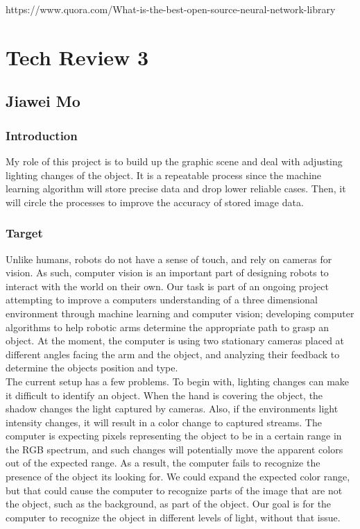 \documentclass[10pt,journal,compsoc, draftclsnofoot,onecolumn]{IEEEtran}
\begin{document}
\noindent
[5]	https://www.quora.com/What-is-the-best-open-source-neural-network-library

\newpage
\section{Tech Review 3}
\subsection{Jiawei Mo}
\subsubsection{Introduction}
My role of this project is to build up the graphic scene and deal with adjusting lighting changes of the object. It is a repeatable process since the machine learning algorithm will store precise data and drop lower reliable cases. Then, it will circle the processes to improve the accuracy of stored image data. 

\subsubsection{Target}
Unlike humans, robots do not have a sense of touch, and rely on cameras for vision. As such, computer vision is an important part of designing robots to interact with the world on their own. Our task is part of an ongoing project attempting to improve a computers understanding of a three dimensional environment through machine learning and computer vision; developing computer algorithms to help robotic arms determine the appropriate path to grasp an object. At the moment, the computer is using two stationary cameras placed at different angles facing the arm and the object, and analyzing their feedback to determine the objects position and type. \\

\noindent
The current setup has a few problems. To begin with, lighting changes can make it difficult to identify an object. When the hand is covering the object, the shadow changes the light captured by cameras. Also, if the environments light intensity changes, it will result in a color change to captured streams. The computer is expecting pixels representing the object to be in a certain range in the RGB spectrum, and such changes will potentially move the apparent colors out of the expected range. As a result, the computer fails to recognize the presence of the object its looking for. We could expand the expected color range, but that could cause the computer to recognize parts of the image that are not the object, such as the background, as part of the object. Our goal is for the computer to recognize the object in different levels of light, without that issue. \\
\end{document}
